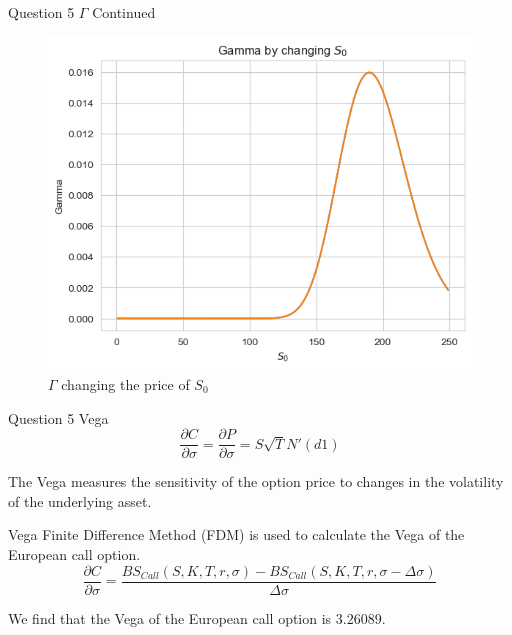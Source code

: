 \documentclass[compress,12pt]{beamer}
\begin{document}
\begin{frame}{Question 5 $\Gamma$ Continued}
      \begin{figure}
            \centering
            \includegraphics[scale=0.6]{./imgs/gamma.png}
            \caption{$\Gamma$ changing the price of $S_0$}
      \end{figure}

\end{frame}

\begin{frame}{Question 5 Vega}
      \begin{equation*}
            \frac{\partial {C}}{\partial \sigma} =\frac{\partial {P}}{\partial \sigma}=S\sqrt{T} N'(d1)
      \end{equation*}

      The Vega measures the sensitivity of the option price to changes in the volatility of the underlying asset.

      Vega Finite Difference Method (FDM) is used to calculate the Vega of the European call option.
      \tiny{
            \begin{equation*}
                  \frac{\partial C}{\partial \sigma} = \frac{BS_{Call}(S, K, T,r,\sigma) - BS_{Call}(S , K, T,r,\sigma -\Delta \sigma )}{\Delta \sigma}
            \end{equation*}
      }
      \normalsize
      \begin{tcolorbox}
            We find that the Vega of the European call option is $\boxed{3.26089}$.
      \end{tcolorbox}

\end{frame}
\end{document}
